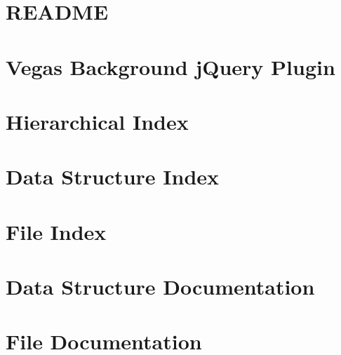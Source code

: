 \let\mypdfximage\pdfximage\def\pdfximage{\immediate\mypdfximage}\documentclass[twoside]{book}
\newcommand{\+}{\discretionary{\mbox{\scriptsize$\hookleftarrow$}}{}{}}
\newcommand{\clearemptydoublepage}{%
  \newpage{\pagestyle{empty}\cleardoublepage}%
}
\begin{document}
\chapter{R\+E\+A\+D\+ME}
\label{md__c_1__users__miss__louc__documents__c_p_n_v__depot__git_kraken__proj__wine_src_view_content_s240f759c42eadbc462659f70460bc020}

\chapter{Vegas Background j\+Query Plugin}
\label{md__c_1__users__miss__louc__documents__c_p_n_v__depot__git_kraken__proj__wine_src_view_content_site_scripts_vegas__r_e_a_d_m_e}

\chapter{Hierarchical Index}

\chapter{Data Structure Index}

\chapter{File Index}

\chapter{Data Structure Documentation}




\chapter{File Documentation}










\backmatter
\newpage
{}
\clearemptydoublepage
{}
\printindex
\end{document}

